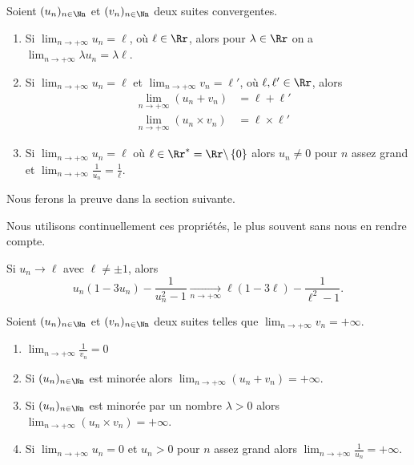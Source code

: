 \documentclass[class=report,crop=false]{standalone}
\begin{document}
\begin{proposition}
\label{prop:suitelimite}
Soient $(u_n)_{n\in \Nn}$ et $(v_n)_{n\in \Nn}$ deux suites convergentes.
\begin{enumerate}
  \item Si $\lim_{n\to +\infty}u_n=\ell$, où $\ell\in \Rr$, alors pour $\lambda \in \Rr$ on a $\lim_{n\to +\infty}\lambda u_n=\lambda \ell$.
  \item Si $\lim_{n\to +\infty}u_n=\ell$ et $\lim_{n\to +\infty}v_n=\ell'$, où $\ell,\ell'\in \Rr$, alors
    \begin{align*}
      \lim_{n\to +\infty}\left(u_n+v_n\right)&=\ell+\ell'&\\
      \lim_{n\to +\infty}\left(u_n\times v_n\right)&=\ell\times \ell'
    \end{align*}
  \item Si $\lim_{n\to +\infty}u_n=\ell$ où $\ell\in \Rr^*= \Rr\backslash \left\{0\right\}$
alors $u_n\neq 0 $ pour $n$ assez grand et $\lim_{n\to +\infty}\frac{1}{u_n}=\frac{1}{\ell}$.
\end{enumerate}
\end{proposition}

Nous ferons la preuve dans la section suivante.

Nous utilisons continuellement ces propriétés, le plus souvent sans nous en rendre compte.
\begin{exemple}
Si $u_n \to \ell$ avec $\ell \neq \pm 1$, alors
$$u_n(1-3u_n)-\frac{1}{u_n^2-1} \xrightarrow[n\to +\infty]{} \ell(1-3\ell) - \frac{1}{\ell^2-1}.$$
\end{exemple}


\begin{proposition}
\label{prop:suiteinfty}
  Soient $(u_n)_{n\in \Nn}$ et $(v_n)_{n\in \Nn}$ deux suites telles que $\lim_{n\to +\infty}v_n=+\infty$.
  \begin{enumerate}
    \item  $\lim_{n\to +\infty}\frac{1}{v_n}=0$
    \item Si $(u_n)_{n\in \Nn}$ est minorée alors  $\lim_{n\to +\infty}\left(u_n+v_n\right)=+\infty$.
    \item Si $(u_n)_{n\in \Nn}$ est minorée par un nombre $\lambda>0$
alors $\lim_{n\to +\infty}\left(u_n\times v_n\right)=+\infty$.
    \item Si $\lim_{n\to +\infty}u_n= 0$ et $u_n>0$ pour $n$ assez
grand alors $\lim_{n\to +\infty}\frac{1}{u_n}=+\infty$.
  \end{enumerate}
\end{proposition}
\end{document}
